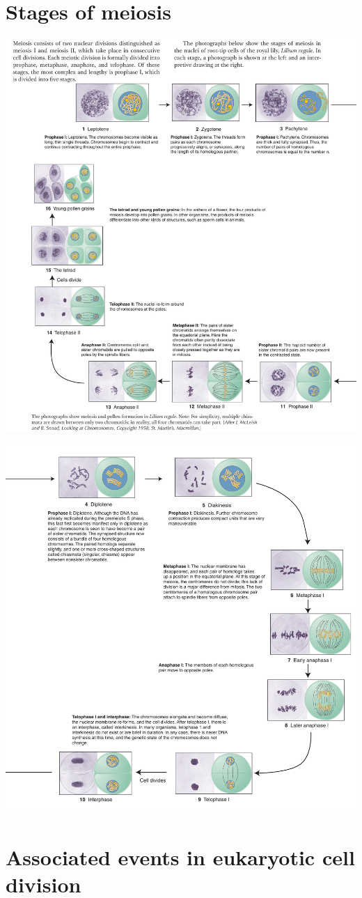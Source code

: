 \documentclass[11pt,ignorenonframetext,aspectratio=169]{beamer}
\begin{document}
\hypertarget{stages-of-meiosis}{%
\section{Stages of meiosis}\label{stages-of-meiosis}}

\begin{frame}{}
\protect\hypertarget{section-12}{}
\begin{center}\includegraphics[width=0.5\linewidth]{../images/meiosis_stages1} \end{center}
\end{frame}

\begin{frame}{}
\protect\hypertarget{section-13}{}
\begin{center}\includegraphics[width=0.58\linewidth]{../images/meiosis_stages2} \end{center}
\end{frame}

\hypertarget{associated-events-in-eukaryotic-cell-division}{%
\section{Associated events in eukaryotic cell
division}\label{associated-events-in-eukaryotic-cell-division}}
\end{document}
